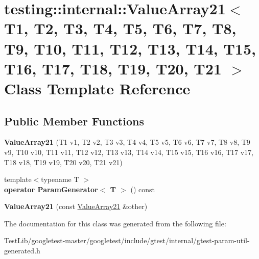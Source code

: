 \hypertarget{classtesting_1_1internal_1_1ValueArray21}{}\section{testing\+:\+:internal\+:\+:Value\+Array21$<$ T1, T2, T3, T4, T5, T6, T7, T8, T9, T10, T11, T12, T13, T14, T15, T16, T17, T18, T19, T20, T21 $>$ Class Template Reference}
\label{classtesting_1_1internal_1_1ValueArray21}
\subsection*{Public Member Functions}
\begin{DoxyCompactItemize}
\item 
\mbox{\label{classtesting_1_1internal_1_1ValueArray21_a111043ab8258ecb243c67c84d1f8e0f4}} 
{\bfseries Value\+Array21} (T1 v1, T2 v2, T3 v3, T4 v4, T5 v5, T6 v6, T7 v7, T8 v8, T9 v9, T10 v10, T11 v11, T12 v12, T13 v13, T14 v14, T15 v15, T16 v16, T17 v17, T18 v18, T19 v19, T20 v20, T21 v21)
\item 
\mbox{\label{classtesting_1_1internal_1_1ValueArray21_aa5b2264c55d6b5315622e2e5c3deeb35}} 
{\footnotesize template$<$typename T $>$ }\\{\bfseries operator Param\+Generator$<$ T $>$} () const
\item 
\mbox{\label{classtesting_1_1internal_1_1ValueArray21_af0804d08ff252ed8f942ac48f90ccef3}} 
{\bfseries Value\+Array21} (const \hyperlink{classtesting_1_1internal_1_1ValueArray21}{Value\+Array21} \&other)
\end{DoxyCompactItemize}


The documentation for this class was generated from the following file\+:\begin{DoxyCompactItemize}
\item 
Test\+Lib/googletest-\/master/googletest/include/gtest/internal/gtest-\/param-\/util-\/generated.\+h\end{DoxyCompactItemize}
